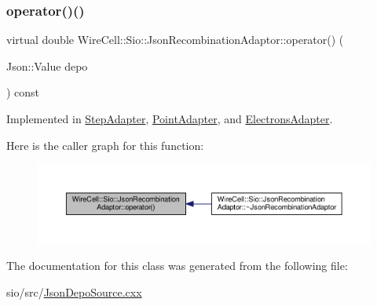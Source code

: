 \subsubsection{\texorpdfstring{operator()()}{operator()()}}
{\footnotesize\ttfamily virtual double Wire\+Cell\+::\+Sio\+::\+Json\+Recombination\+Adaptor\+::operator() (\begin{DoxyParamCaption}\item[{Json\+::\+Value}]{depo }\end{DoxyParamCaption}) const\hspace{0.3cm}{\ttfamily [pure virtual]}}



Implemented in \hyperlink{class_step_adapter_a62cc5e77f7284972207ce48476ee4e9a}{Step\+Adapter}, \hyperlink{class_point_adapter_a37a981e5af75e1d513658dcbb1e35eb3}{Point\+Adapter}, and \hyperlink{class_electrons_adapter_a1480df3bcb8fdfb34608f2397782a7ee}{Electrons\+Adapter}.

Here is the caller graph for this function\+:
\nopagebreak
\begin{figure}[H]
\begin{center}
\leavevmode
\includegraphics[width=350pt]{class_sio_1_1_json_recombination_adaptor_abb1bebe500df507e3e9662e0026b7025_icgraph}
\end{center}
\end{figure}


The documentation for this class was generated from the following file\+:\begin{DoxyCompactItemize}
\item 
sio/src/\hyperlink{_json_depo_source_8cxx}{Json\+Depo\+Source.\+cxx}\end{DoxyCompactItemize}
